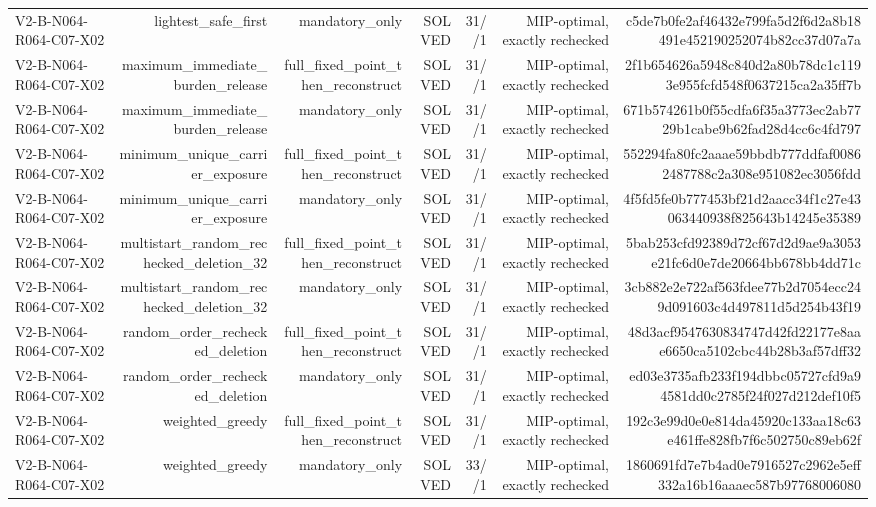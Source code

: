 {\begin{longtable}{lrrrrrr}
V2-B-N064-R064-C07-X02 & lightest\_safe\_first & mandatory\_only & SOLVED & 31//1 & MIP-optimal, exactly rechecked & c5de7b0fe2af46432e799fa5d2f6d2a8b18491e452190252074b82cc37d07a7a \\
V2-B-N064-R064-C07-X02 & maximum\_immediate\_burden\_release & full\_fixed\_point\_then\_reconstruct & SOLVED & 31//1 & MIP-optimal, exactly rechecked & 2f1b654626a5948c840d2a80b78dc1c1193e955fcfd548f0637215ca2a35ff7b \\
V2-B-N064-R064-C07-X02 & maximum\_immediate\_burden\_release & mandatory\_only & SOLVED & 31//1 & MIP-optimal, exactly rechecked & 671b574261b0f55cdfa6f35a3773ec2ab7729b1cabe9b62fad28d4cc6c4fd797 \\
V2-B-N064-R064-C07-X02 & minimum\_unique\_carrier\_exposure & full\_fixed\_point\_then\_reconstruct & SOLVED & 31//1 & MIP-optimal, exactly rechecked & 552294fa80fc2aaae59bbdb777ddfaf00862487788c2a308e951082ec3056fdd \\
V2-B-N064-R064-C07-X02 & minimum\_unique\_carrier\_exposure & mandatory\_only & SOLVED & 31//1 & MIP-optimal, exactly rechecked & 4f5fd5fe0b777453bf21d2aacc34f1c27e43063440938f825643b14245e35389 \\
V2-B-N064-R064-C07-X02 & multistart\_random\_rechecked\_deletion\_32 & full\_fixed\_point\_then\_reconstruct & SOLVED & 31//1 & MIP-optimal, exactly rechecked & 5bab253cfd92389d72cf67d2d9ae9a3053e21fc6d0e7de20664bb678bb4dd71c \\
V2-B-N064-R064-C07-X02 & multistart\_random\_rechecked\_deletion\_32 & mandatory\_only & SOLVED & 31//1 & MIP-optimal, exactly rechecked & 3cb882e2e722af563fdee77b2d7054ecc249d091603c4d497811d5d254b43f19 \\
V2-B-N064-R064-C07-X02 & random\_order\_rechecked\_deletion & full\_fixed\_point\_then\_reconstruct & SOLVED & 31//1 & MIP-optimal, exactly rechecked & 48d3acf9547630834747d42fd22177e8aae6650ca5102cbc44b28b3af57dff32 \\
V2-B-N064-R064-C07-X02 & random\_order\_rechecked\_deletion & mandatory\_only & SOLVED & 31//1 & MIP-optimal, exactly rechecked & ed03e3735afb233f194dbbc05727cfd9a94581dd0c2785f24f027d212def10f5 \\
V2-B-N064-R064-C07-X02 & weighted\_greedy & full\_fixed\_point\_then\_reconstruct & SOLVED & 31//1 & MIP-optimal, exactly rechecked & 192c3e99d0e0e814da45920c133aa18c63e461ffe828fb7f6c502750c89eb62f \\
V2-B-N064-R064-C07-X02 & weighted\_greedy & mandatory\_only & SOLVED & 33//1 & MIP-optimal, exactly rechecked & 1860691fd7e7b4ad0e7916527c2962e5eff332a16b16aaaec587b97768006080 \\

\end{longtable}}
